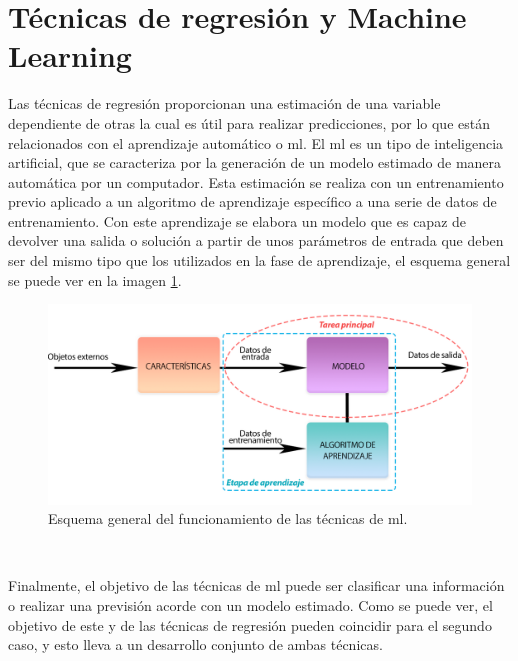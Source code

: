 \section{Técnicas de regresión y Machine Learning}
\par Las técnicas de regresión proporcionan una estimación de una variable dependiente de otras la cual es útil para realizar predicciones, por lo que están relacionados con el aprendizaje automático o \gls{ml}. El \gls{ml} es un tipo de inteligencia artificial, que se caracteriza por la generación de un modelo estimado de manera automática por un computador. Esta estimación se realiza con un entrenamiento previo aplicado a un algoritmo de aprendizaje específico a una serie de datos de entrenamiento. Con este aprendizaje se elabora un modelo que es capaz de devolver una salida o solución a partir de unos parámetros de entrada que deben ser del mismo tipo que los utilizados en la fase de aprendizaje, el esquema general se puede ver en la imagen \ref{fig:ml}. 
\\
\begin{figure}[h]
    \centering
    \includegraphics[width=.9\linewidth]{archivos/ESQUEMA_ML}
    \caption{Esquema general del funcionamiento de las técnicas de \gls{ml}.}
    \label{fig:ml}
\end{figure}
\\
\par Finalmente, el objetivo de las técnicas de \gls{ml} puede ser clasificar una información o realizar una previsión acorde con un modelo estimado. Como se puede ver, el objetivo de este y de las técnicas de regresión pueden coincidir para el segundo caso, y esto lleva a un desarrollo conjunto de ambas técnicas. 

